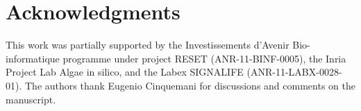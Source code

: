 \documentclass[10pt,letterpaper]{article}
\begin{document}
\section*{Acknowledgments}
This work was partially supported by the Investissements d'Avenir Bio-informatique programme under project RESET (ANR-11-BINF-0005), the Inria Project Lab Algae in silico, and the Labex SIGNALIFE (ANR-11-LABX-0028-01).
The authors thank Eugenio Cinquemani for discussions and comments on the manuscript.

\nolinenumbers

%
%
% 

\end{document}
